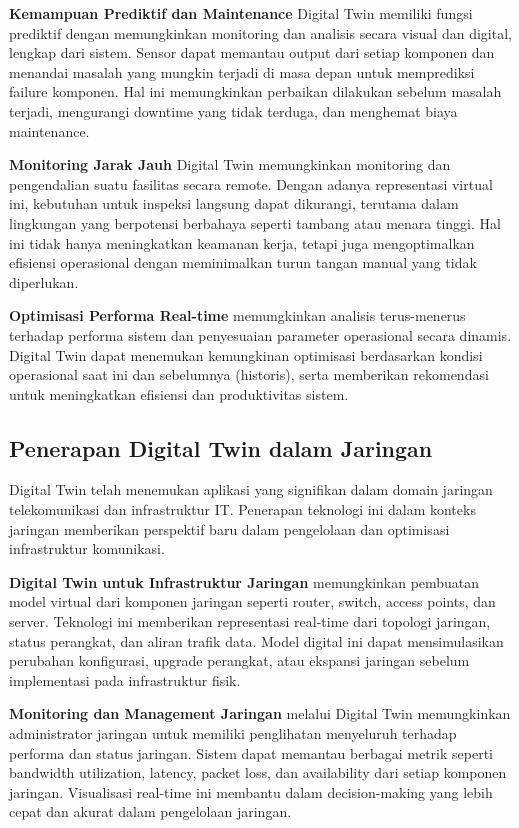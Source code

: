 \textbf{Kemampuan Prediktif dan Maintenance} Digital Twin memiliki fungsi prediktif dengan memungkinkan monitoring dan analisis secara visual dan digital, lengkap dari sistem. Sensor dapat memantau output dari setiap komponen dan menandai masalah yang mungkin terjadi di masa depan untuk memprediksi failure komponen. Hal ini memungkinkan perbaikan dilakukan sebelum masalah terjadi, mengurangi downtime yang tidak terduga, dan menghemat biaya maintenance.

\textbf{Monitoring Jarak Jauh} Digital Twin memungkinkan monitoring dan pengendalian suatu fasilitas secara remote. Dengan adanya representasi virtual ini, kebutuhan untuk inspeksi langsung dapat dikurangi, terutama dalam lingkungan yang berpotensi berbahaya seperti tambang atau menara tinggi. Hal ini tidak hanya meningkatkan keamanan kerja, tetapi juga mengoptimalkan efisiensi operasional dengan meminimalkan turun tangan manual yang tidak diperlukan.

\textbf{Optimisasi Performa Real-time} memungkinkan analisis terus-menerus terhadap performa sistem dan penyesuaian parameter operasional secara dinamis. Digital Twin dapat menemukan kemungkinan optimisasi berdasarkan kondisi operasional saat ini dan sebelumnya (historis), serta memberikan rekomendasi untuk meningkatkan efisiensi dan produktivitas sistem.

\subsection{Penerapan Digital Twin dalam Jaringan}

Digital Twin telah menemukan aplikasi yang signifikan dalam domain jaringan telekomunikasi dan infrastruktur IT. Penerapan teknologi ini dalam konteks jaringan memberikan perspektif baru dalam pengelolaan dan optimisasi infrastruktur komunikasi.

\textbf{Digital Twin untuk Infrastruktur Jaringan} memungkinkan pembuatan model virtual dari komponen jaringan seperti router, switch, access points, dan server. Teknologi ini memberikan representasi real-time dari topologi jaringan, status perangkat, dan aliran trafik data. Model digital ini dapat mensimulasikan perubahan konfigurasi, upgrade perangkat, atau ekspansi jaringan sebelum implementasi pada infrastruktur fisik.

\textbf{Monitoring dan Management Jaringan} melalui Digital Twin memungkinkan administrator jaringan untuk memiliki penglihatan menyeluruh terhadap performa dan status jaringan. Sistem dapat memantau berbagai metrik seperti bandwidth utilization, latency, packet loss, dan availability dari setiap komponen jaringan. Visualisasi real-time ini membantu dalam decision-making yang lebih cepat dan akurat dalam pengelolaan jaringan.

